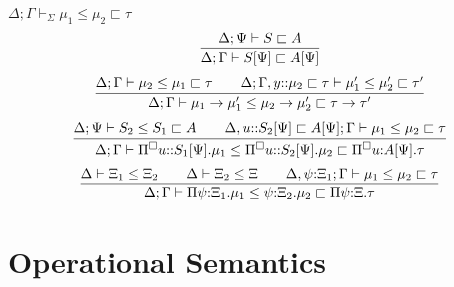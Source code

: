 \documentclass[letterpaper, 11pt]{article}
\newcommand{\rar}{\rightarrow}
\begin{document}
    $\boxed{ \Delta; \Gamma \vdash_\Sigma \mu_1 \leq \mu_2 \sqsubset \tau}$
    \begin{align*}
      \infer{ \Delta; \Gamma \vdash S[\Psi] \sqsubset A[\Psi]}
            {
               \Delta; \Psi \vdash S \sqsubset A
            }
    \end{align*}
    \begin{align*}
      \infer{ \Delta; \Gamma \vdash\mu_1 \rar \mu_1' \leq \mu_2 \rar \mu_2' \sqsubset \tau \rar \tau'}
            {
               \Delta; \Gamma \vdash \mu_2 \leq \mu_1 \sqsubset \tau
              &&
               \Delta; \Gamma, y{::} \mu_2 \sqsubset \tau \vdash \mu_1' \leq \mu_2' \sqsubset \tau'
            }
    \end{align*}
    \begin{align*}
      \infer{ \Delta; \Gamma \vdash\Pi^\square u{::}S_1[\Psi]. \mu_1 \leq \Pi^\square u{::}S_2[\Psi]. \mu_2 \sqsubset \Pi^\square u{:} A[\Psi]. \tau}
            {
               \Delta; \Psi \vdash S_2 \leq S_1 \sqsubset A
              &&
               \Delta, u{::} S_2[\Psi] \sqsubset A[\Psi]; \Gamma \vdash \mu_1 \leq \mu_2 \sqsubset \tau
            }
    \end{align*}
    \begin{align*}
      \infer{ \Delta; \Gamma \vdash \Pi \psi{:}\Xi_1. \mu_1 \leq \psi{:}\Xi_2. \mu_2 \sqsubset \Pi \psi{:}\Xi. \tau}
            {
               \Delta \vdash \Xi_1 \leq \Xi_2
              &&
               \Delta \vdash \Xi_2 \leq \Xi
              &&
              \Delta,\psi{:}\Xi_1; \Gamma \vdash \mu_1 \leq \mu_2 \sqsubset \tau
            }
    \end{align*}

    \section{Operational Semantics}


    
        
\end{document}
